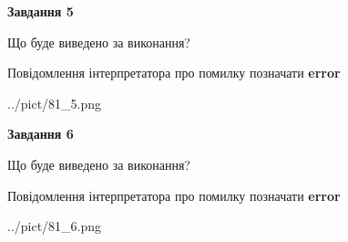 \documentclass[12pt, ukrainian]{article}
\begin{document}
{{\begin {center}\textbf{Завдання 5}\end {center}}\par
Що буде виведено за виконання? \par
Повідомлення інтерпретатора про помилку позначати \textbf{error}

\begin{center}
	{../pict/81_5.png}
\end{center}
\newpage

{\begin {center}\textbf{Завдання 6}\end {center}}\par
Що буде виведено за виконання? \par
Повідомлення інтерпретатора про помилку позначати \textbf{error}

\begin{center}
	{../pict/81_6.png}
\end{center}
\newpage

}
\end{document}
